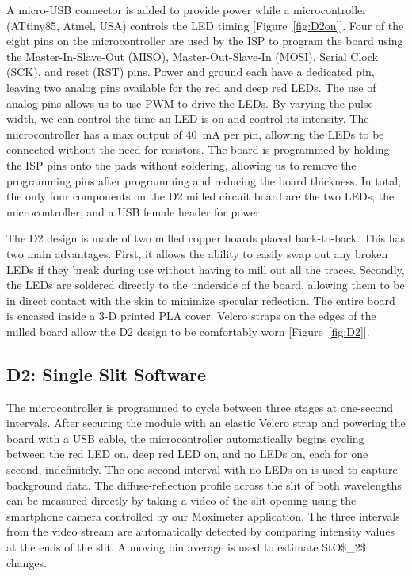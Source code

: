 A micro-USB connector is added to provide power while a microcontroller (ATtiny85, Atmel, USA) controls the \ac{LED} timing [Figure~\ref{fig:D2on}]. Four of the eight pins on the microcontroller are used by the \ac{ISP} to program the board using the Master-In-Slave-Out (MISO), Master-Out-Slave-In (MOSI), Serial Clock (SCK), and reset (RST) pins. Power and ground each have a dedicated pin, leaving two analog pins available for the red and deep red \ac{LED}s. The use of analog pins allows us to use \ac{PWM} to drive the \ac{LED}s. By varying the pulse width, we can control the time an \ac{LED} is on and control its intensity. The microcontroller has a max output of 40~mA per pin, allowing the \ac{LED}s to be connected without the need for resistors. The board is programmed by holding the \ac{ISP} pins onto the pads without soldering, allowing us to remove the programming pins after programming and reducing the board thickness. In total, the only four components on the D2 milled circuit board are the two \ac{LED}s, the microcontroller, and a USB female header for power. 

The D2 design is made of two milled copper boards placed back-to-back. This has two main advantages. First, it allows the ability to easily swap out any broken \ac{LED}s if they break during use without having to mill out all the traces. Secondly, the \ac{LED}s are soldered directly to the underside of the board, allowing them to be in direct contact with the skin to minimize specular reflection. The entire board is encased inside a 3-D printed \ac{PLA} cover. Velcro straps on the edges of the milled board allow the D2 design to be comfortably worn [Figure~\ref{fig:D2}]. 

\subsection{D2: Single Slit Software}
The microcontroller is programmed to cycle between three stages at one-second intervals. After securing the module with an elastic Velcro strap and powering the board with a USB cable, the microcontroller automatically begins cycling between the red \ac{LED} on, deep red \ac{LED} on, and no \ac{LED}s on, each for one second, indefinitely. The one-second interval with no \ac{LED}s on is used to capture background data. The diffuse-reflection profile across the slit of both wavelengths can be measured directly by taking a video of the slit opening using the smartphone camera controlled by our Moximeter application. The three intervals from the video stream are automatically detected by comparing intensity values at the ends of the slit. A moving bin average is used to estimate \ac{StO$_2$} changes. 


